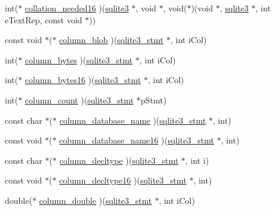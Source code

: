 \begin{DoxyCompactItemize}
\item 
int($\ast$ \hyperlink{structsqlite3__api__routines_a8c4e7afdf70af85fc133adfc1ddb8401}{collation\-\_\-needed16} )(\hyperlink{structsqlite3}{sqlite3} $\ast$, void $\ast$, void($\ast$)(void $\ast$, \hyperlink{structsqlite3}{sqlite3} $\ast$, int e\-Text\-Rep, const void $\ast$))
\item 
const void $\ast$($\ast$ \hyperlink{structsqlite3__api__routines_a85459d5ec92d143a2a3da9143112a707}{column\-\_\-blob} )(\hyperlink{sqlite3_8c_af2a033da1327cdd77f0a174a09aedd0c}{sqlite3\-\_\-stmt} $\ast$, int i\-Col)
\item 
int($\ast$ \hyperlink{structsqlite3__api__routines_a79150244afb5f778840bc9df72d55342}{column\-\_\-bytes} )(\hyperlink{sqlite3_8c_af2a033da1327cdd77f0a174a09aedd0c}{sqlite3\-\_\-stmt} $\ast$, int i\-Col)
\item 
int($\ast$ \hyperlink{structsqlite3__api__routines_ac1daf0a08de4a33c8db27a29f13a26ad}{column\-\_\-bytes16} )(\hyperlink{sqlite3_8c_af2a033da1327cdd77f0a174a09aedd0c}{sqlite3\-\_\-stmt} $\ast$, int i\-Col)
\item 
int($\ast$ \hyperlink{structsqlite3__api__routines_af750a4727dc59edb4ad2933e28bfa358}{column\-\_\-count} )(\hyperlink{sqlite3_8c_af2a033da1327cdd77f0a174a09aedd0c}{sqlite3\-\_\-stmt} $\ast$p\-Stmt)
\item 
const char $\ast$($\ast$ \hyperlink{structsqlite3__api__routines_a585bc7d559987f0621d7cf2230165e96}{column\-\_\-database\-\_\-name} )(\hyperlink{sqlite3_8c_af2a033da1327cdd77f0a174a09aedd0c}{sqlite3\-\_\-stmt} $\ast$, int)
\item 
const void $\ast$($\ast$ \hyperlink{structsqlite3__api__routines_a707ef52cfe0e07ebddb86e078f9f0caf}{column\-\_\-database\-\_\-name16} )(\hyperlink{sqlite3_8c_af2a033da1327cdd77f0a174a09aedd0c}{sqlite3\-\_\-stmt} $\ast$, int)
\item 
const char $\ast$($\ast$ \hyperlink{structsqlite3__api__routines_afca592a63d3a249ddb0a042416237a5a}{column\-\_\-decltype} )(\hyperlink{sqlite3_8c_af2a033da1327cdd77f0a174a09aedd0c}{sqlite3\-\_\-stmt} $\ast$, int i)
\item 
const void $\ast$($\ast$ \hyperlink{structsqlite3__api__routines_a11d10f42586997006fd7ab07aaa365bf}{column\-\_\-decltype16} )(\hyperlink{sqlite3_8c_af2a033da1327cdd77f0a174a09aedd0c}{sqlite3\-\_\-stmt} $\ast$, int)
\item 
double($\ast$ \hyperlink{structsqlite3__api__routines_afd21003df28cb46354c00599b90e6de5}{column\-\_\-double} )(\hyperlink{sqlite3_8c_af2a033da1327cdd77f0a174a09aedd0c}{sqlite3\-\_\-stmt} $\ast$, int i\-Col)

\end{DoxyCompactItemize}
